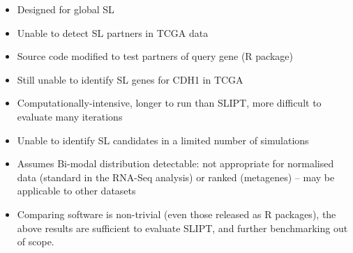 \begin{itemize}
 \item Designed for global SL
 \item Unable to detect SL partners in \gls{TCGA} data
 \item Source code modified to test partners of query gene (R package)
 \item Still unable to identify SL genes for CDH1 in TCGA
 \item Computationally-intensive, longer to run than SLIPT, more difficult to evaluate many iterations
 \item Unable to identify SL candidates in a limited number of simulations
 \item Assumes Bi-modal distribution detectable: not appropriate for normalised  data (standard in the \acrshort{RNA}-Seq analysis) or ranked (metagenes) -- may be applicable to other datasets
 \item Comparing software is non-trivial (even those released as R packages), the above results are sufficient to evaluate \gls{SLIPT}, and further benchmarking out of scope.
\end{itemize}

\label{chapt5:compare_compute_time}
\fi


\iffalse
\begin{itemize}
 \item ChiSQ
 \item SLIPT
 \item Correlation
 \item BiSEp
 \item LM/GLM
\end{itemize}


\subsubsection{Testing Synthetic Lethal Genes with Linear Models}
\label{chapt5:compare_linear_model}
[Move to future Dir??]

\begin{itemize}
 \item Strategy to detect SL with linear models by fit to curve (significance) and slope (direction)
 \item Amenable to conditioning on known SL or iterative conditioning on strongest SL to detect other partners of higher-order SL
 \item All attempts: linear, GLM, and linear polynomial (quadratic, cubic, or quintic) underperform \gls{SLIPT}, similar to Pearson correlation results
 \item Linear models and regression may still be an avenue for further detection of SL (e.g., with Bayes)
\end{itemize}
\fi

